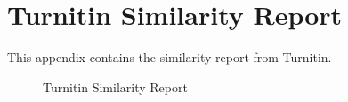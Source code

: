 %
%
%                 

\chapter{Turnitin Similarity Report}
\label{sec:appendixb}

This appendix contains the similarity report from Turnitin.

\begin{figure}[!t]
	\centering
	\captionsetup{justification=centering}
	\caption{Turnitin Similarity Report}
	\label{fig:turnitin}
\end{figure}


